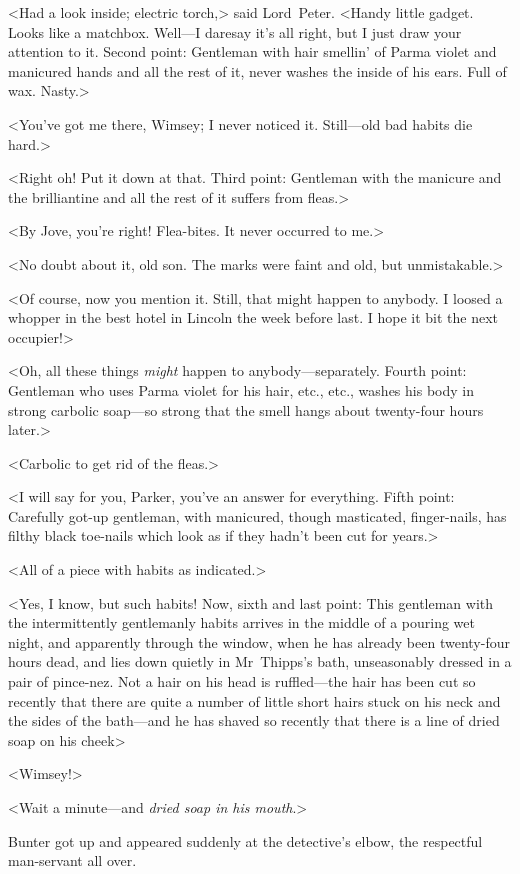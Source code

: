 <Had a look inside; electric torch,> said Lord~Peter. <Handy little gadget. Looks like a matchbox. Well—I daresay it's all right, but I just draw your attention to it. Second point: Gentleman with hair smellin' of Parma violet and manicured hands and all the rest of it, never washes the inside of his ears. Full of wax. Nasty.>

<You've got me there, Wimsey; I never noticed it. Still—old bad habits die hard.>

<Right oh! Put it down at that. Third point: Gentleman with the manicure and the brilliantine and all the rest of it suffers from fleas.>

<By Jove, you're right! Flea-bites. It never occurred to me.>

<No doubt about it, old son. The marks were faint and old, but unmistakable.>

<Of course, now you mention it. Still, that might happen to anybody. I loosed a whopper in the best hotel in Lincoln the week before last. I hope it bit the next occupier!>

<Oh, all these things \textit{might} happen to anybody—separately. Fourth point: Gentleman who uses Parma violet for his hair, etc., etc., washes his body in strong carbolic soap—so strong that the smell hangs about twenty-four hours later.>

<Carbolic to get rid of the fleas.>

<I will say for you, Parker, you've an answer for everything. Fifth point: Carefully got-up gentleman, with manicured, though masticated, finger-nails, has filthy black toe-nails which look as if they hadn't been cut for years.>

<All of a piece with habits as indicated.>

<Yes, I know, but such habits! Now, sixth and last point: This gentleman with the intermittently gentlemanly habits arrives in the middle of a pouring wet night, and apparently through the window, when he has already been twenty-four hours dead, and lies down quietly in Mr~Thipps's bath, unseasonably dressed in a pair of pince-nez. Not a hair on his head is ruffled—the hair has been cut so recently that there are quite a number of little short hairs stuck on his neck and the sides of the bath—and he has shaved so recently that there is a line of dried soap on his cheek\longdash>

<Wimsey!>

<Wait a minute—and \textit{dried soap in his mouth}.>

Bunter got up and appeared suddenly at the detective's elbow, the respectful man-servant all over.


